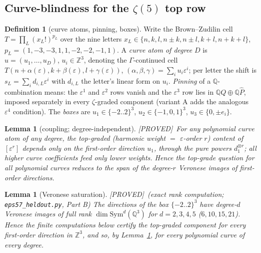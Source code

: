 \documentclass[11pt,reqno]{amsart}
\theoremstyle{plain}
\newtheorem{lemma}[theorem]{Lemma}
\theoremstyle{definition}
\newtheorem{definition}[theorem]{Definition}
\theoremstyle{remark}
\newcommand{\Z}{\mathbb{Z}}
\newcommand{\Q}{\mathbb{Q}}
\newcommand{\Proved}{\textup{\textsf{[PROVED]}}}
\begin{document}
\subsection{Curve-blindness for the $\zeta(5)$ top row}\label{sec:blind}
\begin{definition}[curve atoms, pinning, boxes]\label{def:atoms}
Write the Brown--Zudilin cell
$T=\prod_L(x_L!)^{p_L}$ over the nine letters
$x_L\in\{n,k,l,n{\pm}k,n{\pm}l,k{+}l,n{+}k{+}l\}$,
$p_L=(1,-3,-3,1,1,-2,-2,-1,1)$. A \emph{curve atom of degree $D$} is
$u=(u_1,\dots,u_D)$, $u_i\in\Z^3$, denoting the $\Gamma$-continued cell
$T(n+\alpha(\varepsilon),k+\beta(\varepsilon),l+\gamma(\varepsilon))$,
$(\alpha,\beta,\gamma)=\sum_iu_i\varepsilon^i$; per letter the shift is
$s_L=\sum_id_{i,L}\varepsilon^i$ with $d_{i,L}$ the letter's linear form
on $u_i$. \emph{Pinning} of a $\Q$-combination means: the
$\varepsilon^1$ and $\varepsilon^2$ rows vanish and the $\varepsilon^3$
row lies in $\Q Q\oplus\Q\hat P$, imposed separately in every
$\zeta$-graded component (variant A adds the analogous $\varepsilon^4$
condition). The \emph{boxes} are $u_1\in\{-2..2\}^3$,
$u_2\in\{-1,0,1\}^3$, $u_3\in\{0,\pm e_i\}$.
\end{definition}

\begin{lemma}[coupling; degree-independent]\label{lem:coupling}
\Proved\
For any polynomial curve atom of any degree, the top-graded (harmonic
weight $=$ $\varepsilon$-order $r$) content of $[\varepsilon^r]$ depends
only on the first-order direction $u_1$, through the pure powers
$d_1^{\otimes r}$; all higher curve coefficients feed only lower weights.
Hence the top-grade question for \emph{all} polynomial curves reduces to
the span of the degree-$r$ Veronese images of first-order directions.
\end{lemma}

\begin{lemma}[Veronese saturation]\label{lem:sat}
\Proved\ (exact rank computation; \texttt{eps57\_heldout.py}, Part B)\quad
The directions of the box $\{-2..2\}^3$ have degree-$d$ Veronese images of
full rank $\dim\mathrm{Sym}^d(\Q^3)$ for $d=2,3,4,5$ ($6,10,15,21$). Hence
the finite computations below certify the top-graded component for
\emph{every} first-order direction in $\Z^3$, and so, by
Lemma~\ref{lem:coupling}, for every polynomial curve of every degree.
\end{lemma}
\end{document}

